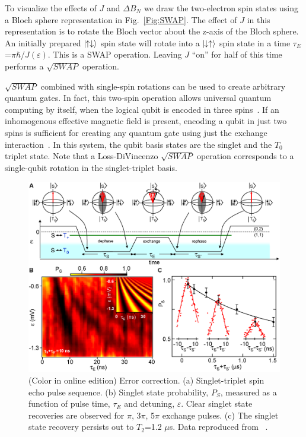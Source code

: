 \documentclass[12pt,aps,nofootinbib]{revtex4-1}
\begin{document}
To visualize the effects of $J$ and $\Delta B_{N}$ we draw the two-electron spin states
using a Bloch sphere representation in Fig.\ \ref{Fig:SWAP}. The
effect of $J$ in this representation is to
rotate the Bloch vector about the z-axis of the Bloch sphere. An
initially prepared $|\!\!\uparrow\downarrow \rangle$ spin state
will rotate into a $|\!\!\downarrow\uparrow \rangle$ spin state in
a time $\tau_E$=$\pi$$\hbar$/$J(\varepsilon)$. This is a SWAP
operation. Leaving $J$ ``on'' for half of this time performs a $\sqrt{SWAP}$ operation. 

$\sqrt{SWAP}$ combined with single-spin rotations can be used to create arbitrary quantum gates. In fact, this two-spin operation allows universal quantum computing by itself, when the logical qubit is encoded in three spins~\cite{DiVincenzoNature2000}. If an inhomogenous effective magnetic field is present, encoding a qubit in just two spins is sufficient for creating any quantum gate using just the exchange interaction~\cite{Levy}. In this system, the qubit basis states are the singlet and the $T_0$ triplet state. Note that a Loss-DiVincenzo $\sqrt{SWAP}$ operation corresponds to a single-qubit rotation in the singlet-triplet basis.

\begin{figure}[ht]
\includegraphics[width=14cm]{hanson_fig49.eps}
\caption{(Color in online edition) Error correction. (a) Singlet-triplet spin echo pulse
sequence. (b) Singlet state probability, $P_{S}$, measured as a
function of pulse time, $\tau_{E}$ and detuning,
$\varepsilon$. Clear singlet state recoveries are observed for $\pi$,
3$\pi$, 5$\pi$ exchange pulses. (c) The singlet state recovery
persists out to $T_2$=1.2 $\mu$s. Data
reproduced from ~\textcite{petta05}.} \label{Fig:Echo}
\end{figure}
\end{document}
